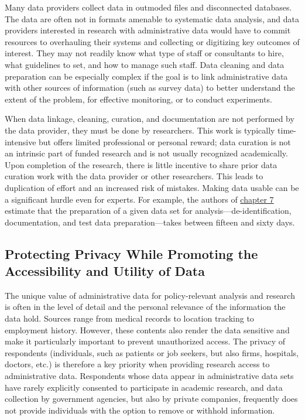 \documentclass[
]{book}
\begin{document}
Many data providers collect data in outmoded files and disconnected databases. The data are often not in formats amenable to systematic data analysis, and data providers interested in research with administrative data would have to commit resources to overhauling their systems and collecting or digitizing key outcomes of interest. They may not readily know what type of staff or consultants to hire, what guidelines to set, and how to manage such staff. Data cleaning and data preparation can be especially complex if the goal is to link administrative data with other sources of information (such as survey data) to better understand the extent of the problem, for effective monitoring, or to conduct experiments.

When data linkage, cleaning, curation, and documentation are not performed by the data provider, they must be done by researchers. This work is typically time-intensive but offers limited professional or personal reward; data curation is not an intrinsic part of funded research and is not usually recognized academically. Upon completion of the research, there is little incentive to share prior data curation work with the data provider or other researchers. This leads to duplication of effort and an increased risk of mistakes. Making data usable can be a significant hurdle even for experts. For example, the authors of \protect\hyperlink{iab}{chapter 7} estimate that the preparation of a given data set for analysis---de-identification, documentation, and test data preparation---takes between fifteen and sixty days.

\hypertarget{protecting-privacy-while-promoting-the-accessibility-and-utility-of-data}{%
\subsection{Protecting Privacy While Promoting the Accessibility and Utility of Data}\label{protecting-privacy-while-promoting-the-accessibility-and-utility-of-data}}

The unique value of administrative data for policy-relevant analysis and research is often in the level of detail and the personal relevance of the information the data hold. Sources range from medical records to location tracking to employment history. However, these contents also render the data sensitive and make it particularly important to prevent unauthorized access. The privacy of respondents (individuals, such as patients or job seekers, but also firms, hospitals, doctors, etc.) is therefore a key priority when providing research access to administrative data. Respondents whose data appear in administrative data sets have rarely explicitly consented to participate in academic research, and data collection by government agencies, but also by private companies, frequently does not provide individuals with the option to remove or withhold information.
\end{document}
